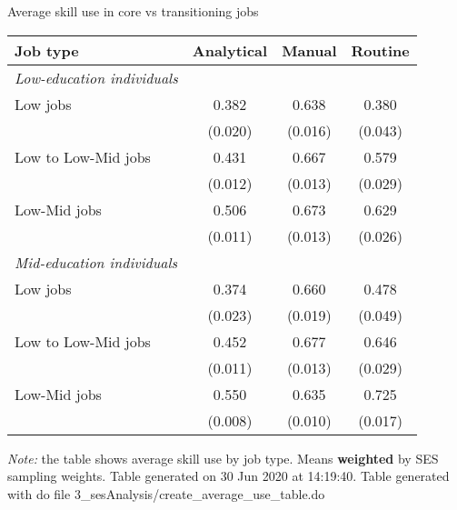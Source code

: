 \begin{center}
\begin{threeparttable}[!h]
\caption{Average skill use in core vs transitioning jobs}
\begin{tabular}{lccc}
\toprule
\toprule
\textbf{Job type}&\multicolumn{1}{c}{\textbf{Analytical}}&\multicolumn{1}{c}{\textbf{Manual}}&\multicolumn{1}{c}{\textbf{Routine}} \\
\midrule
\textit{Low-education individuals} \\  \midrule
\hspace{3mm}Low jobs&       0.382&       0.638&       0.380\\
                    &     (0.020)&     (0.016)&     (0.043)\\
\hspace{3mm}Low to Low-Mid jobs&       0.431&       0.667&       0.579\\
                    &     (0.012)&     (0.013)&     (0.029)\\
\hspace{3mm}Low-Mid jobs&       0.506&       0.673&       0.629\\
                    &     (0.011)&     (0.013)&     (0.026)\\
\textit{Mid-education individuals} \\  \midrule
\hspace{3mm}Low jobs&       0.374&       0.660&       0.478\\
                    &     (0.023)&     (0.019)&     (0.049)\\
\hspace{3mm}Low to Low-Mid  jobs&       0.452&       0.677&       0.646\\
                    &     (0.011)&     (0.013)&     (0.029)\\
\hspace{3mm}Low-Mid jobs&       0.550&       0.635&       0.725\\
                    &     (0.008)&     (0.010)&     (0.017)\\
\bottomrule
\bottomrule
\end{tabular}
\begin{tablenotes}
\item \footnotesize \textit{Note:} the table shows average skill use by job type. Means \textbf{weighted} by SES sampling weights. Table generated on 30 Jun 2020 at 14:19:40. Table generated with do file 3\_sesAnalysis/create\_average\_use\_table.do
\end{tablenotes}
\end{threeparttable}
\end{center}
